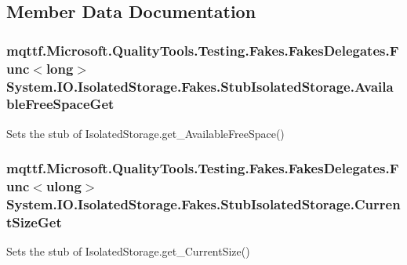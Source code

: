 \subsection{Member Data Documentation}
\hypertarget{class_system_1_1_i_o_1_1_isolated_storage_1_1_fakes_1_1_stub_isolated_storage_a89dbabb6dbe2a6563c0cd0482e111fbc}{
\subsubsection[{Available\-Free\-Space\-Get}]{\setlength{\rightskip}{0pt plus 5cm}mqttf.\-Microsoft.\-Quality\-Tools.\-Testing.\-Fakes.\-Fakes\-Delegates.\-Func$<$long$>$ System.\-I\-O.\-Isolated\-Storage.\-Fakes.\-Stub\-Isolated\-Storage.\-Available\-Free\-Space\-Get}}\label{class_system_1_1_i_o_1_1_isolated_storage_1_1_fakes_1_1_stub_isolated_storage_a89dbabb6dbe2a6563c0cd0482e111fbc}


Sets the stub of Isolated\-Storage.\-get\-\_\-\-Available\-Free\-Space()

\hypertarget{class_system_1_1_i_o_1_1_isolated_storage_1_1_fakes_1_1_stub_isolated_storage_aecbe0c30c6435097313681cbb71dfb16}{
\subsubsection[{Current\-Size\-Get}]{\setlength{\rightskip}{0pt plus 5cm}mqttf.\-Microsoft.\-Quality\-Tools.\-Testing.\-Fakes.\-Fakes\-Delegates.\-Func$<$ulong$>$ System.\-I\-O.\-Isolated\-Storage.\-Fakes.\-Stub\-Isolated\-Storage.\-Current\-Size\-Get}}\label{class_system_1_1_i_o_1_1_isolated_storage_1_1_fakes_1_1_stub_isolated_storage_aecbe0c30c6435097313681cbb71dfb16}


Sets the stub of Isolated\-Storage.\-get\-\_\-\-Current\-Size()

